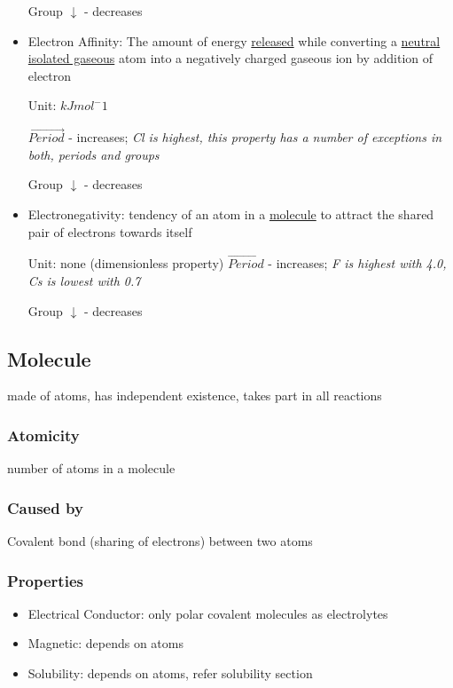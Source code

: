 \documentclass[a4paper]{article}
\begin{document}
\begin{itemize}
			Group $\downarrow$ - decreases

		\item Electron Affinity: The amount of energy \underline{released} while converting a \underline{neutral isolated gaseous} atom into a negatively charged gaseous ion by addition of electron

			Unit: $kJ mol^-1$

			$\vec{{Period}}$ - increases; \it{Cl is highest, this property has a number of exceptions in both, periods and groups}

			Group $\downarrow$ - decreases

		\item Electronegativity: tendency of an atom in a \underline{molecule} to attract the shared pair of electrons towards itself

			Unit: none (dimensionless property)
			$\vec{{Period}}$ - increases; \it{F is highest with 4.0, Cs is lowest with 0.7}

			Group $\downarrow$ - decreases
	\end{itemize}

	\subsection{Molecule}
	made of atoms, has independent existence, takes part in all reactions

	\subsubsection{Atomicity}
	number of atoms in a molecule

	\subsubsection{Caused by}
	Covalent bond (sharing of electrons) between two atoms

	\subsubsection{Properties}
	\begin{itemize}
		\item Electrical Conductor: only polar covalent molecules as electrolytes

		\item Magnetic: depends on atoms

		\item Solubility: depends on atoms, refer solubility section
	\end{itemize}
\end{document}
